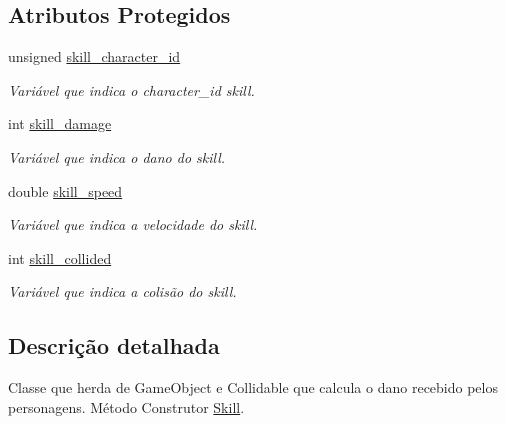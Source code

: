 \subsection*{Atributos Protegidos}
\begin{DoxyCompactItemize}
\item 
\mbox{\label{classSkill_a6b836b689172c632c34ebf2010c7f94e}} 
unsigned \mbox{\hyperlink{classSkill_a6b836b689172c632c34ebf2010c7f94e}{skill\+\_\+character\+\_\+id}}
\begin{DoxyCompactList}\small\item\em Variável que indica o character\+\_\+id skill. \end{DoxyCompactList}\item 
\mbox{\label{classSkill_a68fa3060a454b635aada6662d9fb2322}} 
int \mbox{\hyperlink{classSkill_a68fa3060a454b635aada6662d9fb2322}{skill\+\_\+damage}}
\begin{DoxyCompactList}\small\item\em Variável que indica o dano do skill. \end{DoxyCompactList}\item 
\mbox{\label{classSkill_a5616db66c8db4011c77a9850ade84940}} 
double \mbox{\hyperlink{classSkill_a5616db66c8db4011c77a9850ade84940}{skill\+\_\+speed}}
\begin{DoxyCompactList}\small\item\em Variável que indica a velocidade do skill. \end{DoxyCompactList}\item 
\mbox{\label{classSkill_acde70fa4d6b0b5f31310de514f3a9f4e}} 
int \mbox{\hyperlink{classSkill_acde70fa4d6b0b5f31310de514f3a9f4e}{skill\+\_\+collided}}
\begin{DoxyCompactList}\small\item\em Variável que indica a colisão do skill. \end{DoxyCompactList}\end{DoxyCompactItemize}


\subsection{Descrição detalhada}
Classe que herda de Game\+Object e Collidable que calcula o dano recebido pelos personagens.  Método Construtor \mbox{\hyperlink{classSkill}{Skill}}. 


